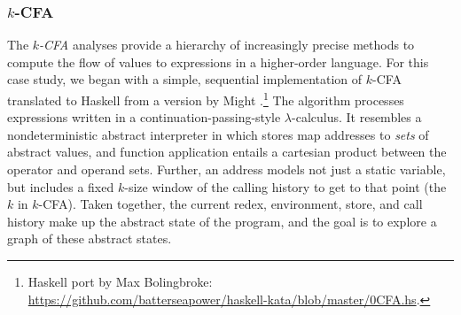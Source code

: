 


\subsubsection{$k$-CFA}

The {\em $k$-CFA} analyses provide a hierarchy of increasingly precise methods
to compute the flow of values to expressions in a higher-order language.  
For this case study, we began with a simple, sequential implementation of $k$-CFA 
translated to Haskell from a version by Might \cite{MightkCFABlog}.\footnote{Haskell
 port by Max Bolingbroke: \url{https://github.com/batterseapower/haskell-kata/blob/master/0CFA.hs}.}
The algorithm processes expressions written in a
continuation-passing-style $\lambda$-calculus.
It resembles a nondeterministic abstract interpreter in which
stores map addresses to {\em sets} of abstract values, and function
application entails a cartesian product between the operator and operand sets.
%
Further, an address models not just a static variable, but includes a fixed $k$-size window
of the calling history to get to that point (the $k$ in $k$-CFA).
%
Taken together, the current 
redex, environment, store, and call history make up the abstract state of the
program, and the goal is to explore a graph of these abstract states.  
%
%

